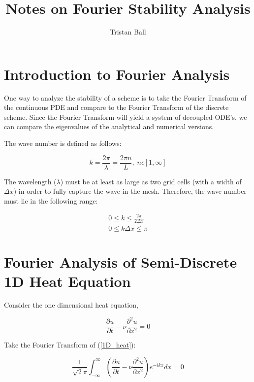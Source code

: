 \documentclass[10pt]{article}
\title{Notes on Fourier Stability Analysis}
\author{Tristan Ball}
\begin{document}
\maketitle
\tableofcontents
\pagebreak


\section{Introduction to Fourier Analysis}

	One way to analyze the stability of a scheme is to take the Fourier Transform of the continuous PDE and compare to the Fourier Transform of the discrete scheme. Since the Fourier Transform will yield a system of decoupled ODE's, we can compare the eigenvalues of the analytical and numerical versions.  
	
	The wave number is defined as follows:

	\begin{equation}
		k = \frac{2 \pi}{\lambda} = \frac{2 \pi n}{L}, \; n \epsilon [1,\infty]
	\end{equation}

	The wavelength ($\lambda$) must be at least as large as two grid cells (with a width of $\Delta x$) in order to fully capture the wave in the mesh. Therefore, the wave number must lie in the following range:

	\begin{equation}
		\begin{aligned}
			0 \leq k \leq \frac{2 \pi}{2 \Delta x} \\
			0 \leq k \Delta x \leq \pi 
		\end{aligned}
	\end{equation}


\section{Fourier Analysis of Semi-Discrete 1D Heat Equation}

	Consider the one dimensional heat equation,
	
	\begin{equation} \label{1D_heat}
		\frac{\partial u}{\partial t} - \nu \frac{\partial^2 u}{\partial x^2} = 0
	\end{equation}

	Take the Fourier Transform of (\ref{1D_heat}):
	
	\begin{equation} \label{1D_heat_FT}
		\frac{1}{\sqrt{2}\pi} \int_{-\infty}^{\infty} \left( \frac{\partial u}{\partial t} - \nu \frac{\partial^2 u}{\partial x^2} \right) e^{-ikx} dx = 0
	\end{equation}
\end{document}
